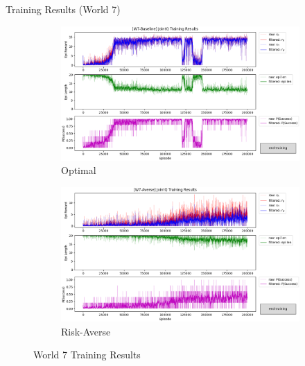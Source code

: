\documentclass[aspectratio=1610, xcolor=dvipsnames]{packages/beamer}
\begin{document}
 \begin{frame}{Training Results (World 7)}
      \begin{figure}
      \centering
          \begin{subfigure}[b]{\Wfig\textwidth}  \centering
              \includegraphics[width=\textwidth]{../results/IDQN_W7/Fig_W7_JointQ_Baseline}
              \caption{Optimal} \label{fig:W7baseline}
          \end{subfigure}
          \hfill
          \begin{subfigure}[b]{\Wfig\textwidth} \centering
              \includegraphics[width=\textwidth]{../results/IDQN_W7//Fig_W7_JointQ_Averse}
              \caption{Risk-Averse} \label{fig:W7averse}
          \end{subfigure}
     \caption{World 7 Training Results}
     \label{fig:W7}
     \end{figure}
 \end{frame}
\end{document}
